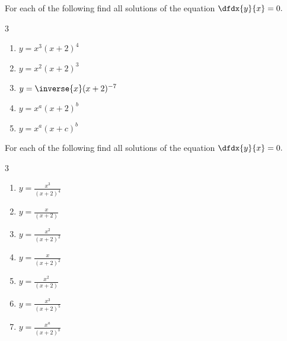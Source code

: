 \begin{ProblemSection}
\begin{embeddedproblem}{}
     \end{embeddedproblem}

  \begin{embeddedproblem}{}
    For each of the following find all solutions of the equation
    $\dfdx{y}{x} =0.$
    \begin{multicols}{3}
      \begin{enumerate}[label={\bf{}(\alph*)}]
      \item $ y=x^3(x+2)^4$
      \item $y=x^2(x+2)^3$
      \item $y=\inverse{x}(x+2)^{-7}$
      \item $y=x^a(x+2)^b$
      \item $y=x^a(x+c)^b$
      \end{enumerate}
    \end{multicols}
  \end{embeddedproblem}
  \begin{embeddedproblem}{}
    For each of the following find all solutions of the equation
    $\dfdx{y}{x} =0.$
    \begin{multicols}{3}
      \begin{enumerate}[label={\bf{}(\alph*)}]
      \item $ y=\frac{x^3}{(x+2)^4}$
      \item $ y=\frac{x }{(x+2)}$
      \item $ y=\frac{x^2}{(x+2)^2}$
      \item $ y=\frac{x }{(x+2)^2}$
      \item $ y=\frac{x^2}{(x+2) }$
      \item $ y=\frac{x^3}{(x+2)^5}$
      \item $ y=\frac{x^a}{(x+2)^b}$
      \end{enumerate}
    \end{multicols}
  \end{embeddedproblem}
  \begin{embeddedproblem}{}

\end{embeddedproblem}
\end{ProblemSection}
